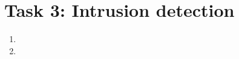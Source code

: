 \section*{Task 3: Intrusion detection}
\begin{enumerate}
\item %
\item \highergradesonly
\end{enumerate}
